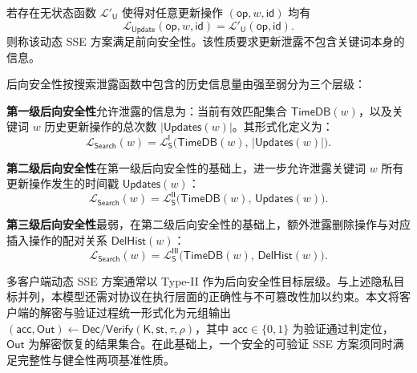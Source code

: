 \begin{definition}[前向安全性]\label{def:forward-security}
若存在无状态函数 $\mathcal{L}'_{\mathsf{U}}$ 使得对任意更新操作 $(\mathsf{op},w,\mathsf{id})$ 均有
\begin{equation}
\mathcal{L}_{\mathsf{Update}}(\mathsf{op},w,\mathsf{id})=\mathcal{L}'_{\mathsf{U}}(\mathsf{op},\mathsf{id}).
\end{equation}
则称该动态 SSE 方案满足前向安全性。该性质要求更新泄露不包含关键词本身的信息。
\end{definition}

\begin{definition}[后向安全性]\label{def:backward-security}
后向安全性按搜索泄露函数中包含的历史信息量由强至弱分为三个层级\cite{10.1145/3133956.3133980,10.1007/978-3-030-29962-0_14}：

\textbf{第一级后向安全性}允许泄露的信息为：当前有效匹配集合 $\mathsf{TimeDB}(w)$，以及关键词 $w$ 历史更新操作的总次数 $|\mathsf{Updates}(w)|$。其形式化定义为：
\begin{equation}
\mathcal{L}_{\mathsf{Search}}(w)=\mathcal{L}^{\mathsf{I}}_{\mathsf{S}}\big(\mathsf{TimeDB}(w),\,|\mathsf{Updates}(w)|\big). \label{eq:bp-type1}
\end{equation}

\textbf{第二级后向安全性}在第一级后向安全性的基础上，进一步允许泄露关键词 $w$ 所有更新操作发生的时间戳 $\mathsf{Updates}(w)$：
\begin{equation}
\mathcal{L}_{\mathsf{Search}}(w)=\mathcal{L}^{\mathsf{II}}_{\mathsf{S}}\big(\mathsf{TimeDB}(w),\,\mathsf{Updates}(w)\big). \label{eq:bp-type2}
\end{equation}

\textbf{第三级后向安全性}最弱，在第二级后向安全性的基础上，额外泄露删除操作与对应插入操作的配对关系 $\mathsf{DelHist}(w)$：
\begin{equation}
\mathcal{L}_{\mathsf{Search}}(w)=\mathcal{L}^{\mathsf{III}}_{\mathsf{S}}\big(\mathsf{TimeDB}(w),\,\mathsf{DelHist}(w)\big). \label{eq:bp-type3}
\end{equation}
\end{definition}

多客户端动态 SSE 方案通常以 Type-II 作为后向安全性目标层级\cite{10.1145/3634737.3657018}。与上述隐私目标并列，本模型还需对协议在执行层面的正确性与不可篡改性加以约束。本文将客户端的解密与验证过程统一形式化为元组输出 $(\mathsf{acc}, \mathsf{Out})\leftarrow \mathsf{Dec/Verify}(\mathsf{K},\mathsf{st},\tau,\rho)$，其中 $\mathsf{acc}\in\{0,1\}$ 为验证通过判定位，$\mathsf{Out}$ 为解密恢复的结果集合。在此基础上，一个安全的可验证 SSE 方案须同时满足完整性与健全性两项基准性质\cite{10.1145/2714576.2714623,8496819,kurosawa2012uc,10.1007/978-3-319-02937-5_17}。

